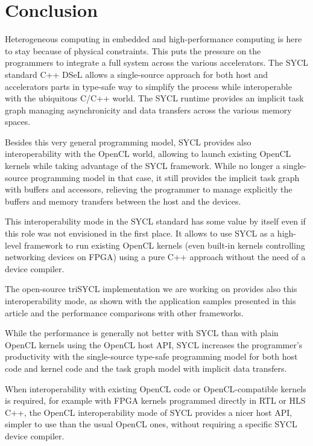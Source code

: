 \documentclass[sigplan]{acmart}
\begin{document}
\section{Conclusion}
\label{sec:conclusion}

Heterogeneous computing in embedded and high-performance computing is
here to stay because of physical constraints. This puts the pressure on
the programmers to integrate a full system across the various
accelerators. The SYCL standard C++ DSeL allows a single-source
approach for both host and accelerators parts in type-safe way to
simplify the process while interoperable with the ubiquitous C/C++
world. The SYCL runtime provides an implicit task graph managing
asynchronicity and data transfers across the various memory spaces.

Besides this very general programming model, SYCL provides also
interoperability with the OpenCL world, allowing to launch existing
OpenCL kernels while taking advantage of the SYCL framework. While no
longer a single-source programming model in that case, it still
provides the implicit task graph with buffers and accessors, relieving
the programmer to manage explicitly the buffers and memory transfers
between the host and the devices.

This interoperability mode in the SYCL standard has some value by
itself even if this role was not envisioned in the first place. It
allows to use SYCL as a high-level framework to run existing OpenCL
kernels (even built-in kernels controlling networking devices on
FPGA) using a pure C++ approach without the need of a device compiler.

The open-source triSYCL implementation \cite{triSYCL} we are working
on provides also this interoperability mode, as shown with the
application samples presented in this article and the performance
comparisons with other frameworks.

While the performance is generally not better with SYCL than with
plain OpenCL kernels using the OpenCL host API, SYCL increases the
programmer's productivity with the single-source type-safe programming
model for both host code and kernel code and the task graph model with
implicit data transfers.

When interoperability with existing OpenCL code or OpenCL-compatible
kernels is required, for example with FPGA kernels programmed directly
in RTL or HLS C++, the OpenCL interoperability mode of SYCL provides a
nicer host API, simpler to use than the usual OpenCL ones, without
requiring a specific SYCL device compiler.




\end{document}

